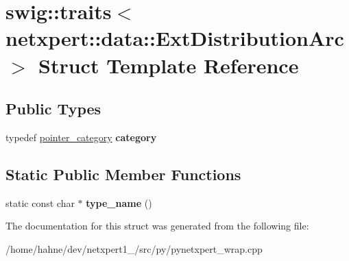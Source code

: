 \hypertarget{structswig_1_1traits_3_01netxpert_1_1data_1_1ExtDistributionArc_01_4}{}\section{swig\+:\+:traits$<$ netxpert\+:\+:data\+:\+:Ext\+Distribution\+Arc $>$ Struct Template Reference}
\label{structswig_1_1traits_3_01netxpert_1_1data_1_1ExtDistributionArc_01_4}
\subsection*{Public Types}
\begin{DoxyCompactItemize}
\item 
typedef \hyperlink{structswig_1_1pointer__category}{pointer\+\_\+category} {\bfseries category}\hypertarget{structswig_1_1traits_3_01netxpert_1_1data_1_1ExtDistributionArc_01_4_ab652482fe2102b13b8a75cba7ca197d5}{}\label{structswig_1_1traits_3_01netxpert_1_1data_1_1ExtDistributionArc_01_4_ab652482fe2102b13b8a75cba7ca197d5}

\end{DoxyCompactItemize}
\subsection*{Static Public Member Functions}
\begin{DoxyCompactItemize}
\item 
static const char $\ast$ {\bfseries type\+\_\+name} ()\hypertarget{structswig_1_1traits_3_01netxpert_1_1data_1_1ExtDistributionArc_01_4_aca308f1f63bd9bd0b0d44d9a751d62dc}{}\label{structswig_1_1traits_3_01netxpert_1_1data_1_1ExtDistributionArc_01_4_aca308f1f63bd9bd0b0d44d9a751d62dc}

\end{DoxyCompactItemize}


The documentation for this struct was generated from the following file\+:\begin{DoxyCompactItemize}
\item 
/home/hahne/dev/netxpert1\+\_/src/py/pynetxpert\+\_\+wrap.\+cpp\end{DoxyCompactItemize}
